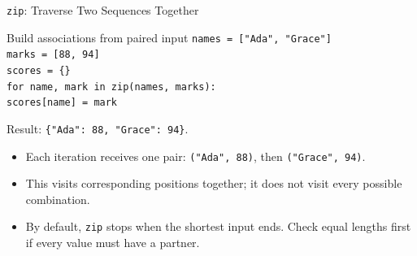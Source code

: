 \documentclass[aspectratio=169,10pt]{beamer}
\begin{document}
\appendix
{}

\begin{frame}{\texttt{zip}: Traverse Two Sequences Together}
  \small
  \begin{block}{Build associations from paired input}
    \texttt{names = ["Ada", "Grace"]}\\
    \texttt{marks = [88, 94]}\\
    \texttt{scores = \{\}}\\
    \texttt{for name, mark in zip(names, marks):}\\
    \hspace{0.20in}\texttt{scores[name] = mark}
  \end{block}
  Result: \texttt{\{"Ada": 88, "Grace": 94\}}.
  \begin{itemize}
    \item Each iteration receives one pair: \texttt{("Ada", 88)}, then \texttt{("Grace", 94)}.
    \item This visits corresponding positions together; it does not visit every possible combination.
    \item By default, \texttt{zip} stops when the shortest input ends. Check equal lengths first if every value must have a partner.
  \end{itemize}
\end{frame}
\end{document}
